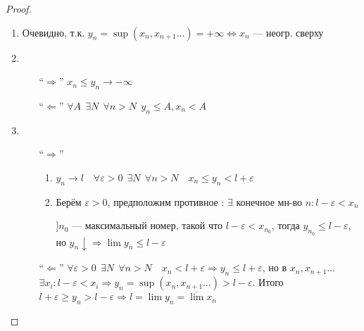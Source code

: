 \begin{proof}
    \begin{enumerate}
        \item Очевидно, т.к. $y_n=\sup(x_n, x_{n+1}\ldots) = +\infty \Leftrightarrow x_n$ --- неогр. сверху
        \item \begin{itemize}
            \item [``$\Rightarrow$''] $x_n\leq y_n \to -\infty$
            \item [``$\Leftarrow$''] $\forall A \ \ \exists N \ \ \forall n>N \ \ y_n\leq A, x_n < A$
            \end{itemize}
        \item \begin{itemize}
            \item [``$\Rightarrow$''] \begin{enumerate}
                \item $y_n \to l \quad \forall \varepsilon>0 \ \ \exists N \ \ \forall n > N \quad x_n \leq y_n < l + \varepsilon$
                \item Берём $\varepsilon>0$, предположим противное : $\exists$ конечное мн-во $n : l-\varepsilon<x_n$
                
                $] n_0$ --- максимальный номер, такой что $l-\varepsilon<x_{n_0}$, тогда $y_{n_0} \leq l - \varepsilon$, но $y_n\downarrow \Rightarrow \lim y_n\leq l-\varepsilon$
            \end{enumerate}
            \item [``$\Leftarrow$''] $\forall \varepsilon>0 \ \ \exists N \ \ \forall n > N \quad x_n<l+\varepsilon \Rightarrow y_n\leq l+\varepsilon$, но в $x_n, x_{n+1}\ldots $ $\exists x_i : l - \varepsilon < x_i \Rightarrow y_n=\sup(x_n, x_{n+1}\ldots) > l - \varepsilon$. Итого $l + \varepsilon \geq y_n > l - \varepsilon \Rightarrow l=\lim y_n=\overline \lim x_n$
        \end{itemize}
    \end{enumerate}
\end{proof}

